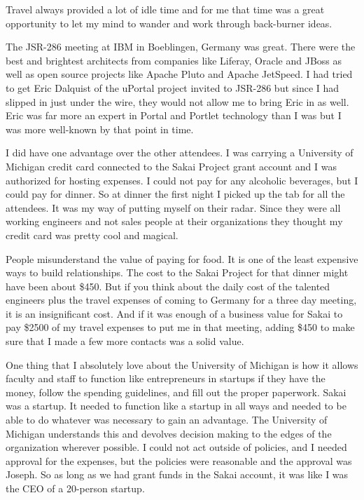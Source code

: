 \documentclass[12pt]{book}
\begin{document}
Travel always provided a lot of idle time and for me that time was a
great opportunity to let my mind to wander and work through back-burner ideas.

The JSR-286 meeting at IBM in Boeblingen, Germany was great.  There were
the best and brightest architects from companies like Liferay, Oracle and JBoss as
well as open source projects like Apache Pluto and Apache JetSpeed.  I had
tried to get Eric Dalquist of the uPortal project invited to JSR-286
but since I had slipped in just under the wire, they would not allow me
to bring Eric in as well.  Eric was far more an expert in Portal and Portlet
technology than I was but I was more well-known by that point in time.

I did have one advantage over the other attendees.  I was carrying
a University of Michigan credit card connected to the Sakai Project
grant account and I was authorized for hosting expenses.  I could
not pay for any alcoholic beverages, but I could pay for dinner.  So
at dinner the first night I picked up the tab for all the attendees.  It was my
way of putting myself on their radar.  Since they were all working engineers
and not sales people at their organizations they thought my credit card was
pretty cool and magical.

People misunderstand the value of paying for food.  It is one of the
least expensive ways to build relationships.  The cost to the Sakai Project for
that dinner might have been about \$450.  But if you think about the
daily cost of the talented engineers plus the travel expenses of coming to
Germany for a three day meeting, it is an insignificant cost.  And if it was
enough of a business value for Sakai to pay \$2500 of my travel
expenses to put me in that meeting, adding \$450 to make sure that
I made a few more contacts was a solid value.

One thing that I absolutely love about the University of Michigan is how it
allows faculty and staff to function like entrepreneurs in startups if they
have the money, follow the spending guidelines, and fill out the proper
paperwork.  Sakai was a startup.  It needed to function like a startup in
all ways and needed to be able to do whatever was necessary to gain
an advantage.  The University of Michigan understands this and devolves
decision making to the edges of the organization wherever possible.
I could not act outside of policies, and I needed approval for the expenses,
but the policies were reasonable and the approval was Joseph.  So as long as
we had grant funds in the Sakai account, it was like I was the CEO of a
20-person startup.
\end{document}
